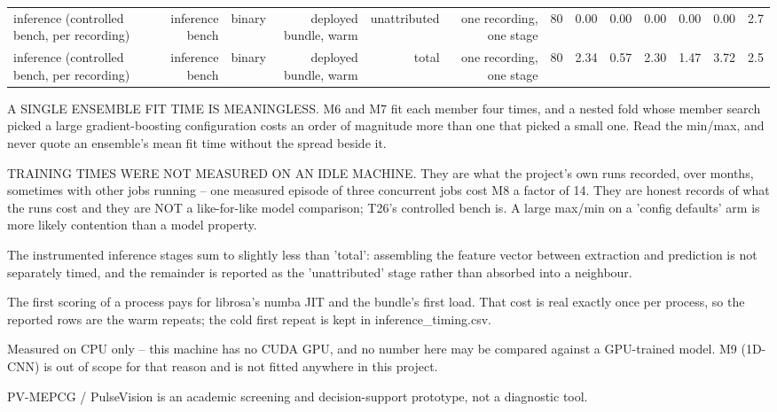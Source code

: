\begin{table}[htbp]
\begin{tabular}{lrrrrrrrrrrrr}
    inference (controlled bench, per recording) & inference bench & binary & deployed bundle, warm & unattributed & one recording, one stage & 80 & 0.00 & 0.00 & 0.00 & 0.00 & 0.00 & 2.7 \\
    inference (controlled bench, per recording) & inference bench & binary & deployed bundle, warm & total & one recording, one stage & 80 & 2.34 & 0.57 & 2.30 & 1.47 & 3.72 & 2.5 \\
    \bottomrule
  \end{tabular}
  \par\footnotesize A SINGLE ENSEMBLE FIT TIME IS MEANINGLESS. M6 and M7 fit each member four times, and a nested fold whose member search picked a large gradient-boosting configuration costs an order of magnitude more than one that picked a small one. Read the min/max, and never quote an ensemble's mean fit time without the spread beside it.
  \par\footnotesize TRAINING TIMES WERE NOT MEASURED ON AN IDLE MACHINE. They are what the project's own runs recorded, over months, sometimes with other jobs running -- one measured episode of three concurrent jobs cost M8 a factor of 14. They are honest records of what the runs cost and they are NOT a like-for-like model comparison; T26's controlled bench is. A large max/min on a 'config defaults' arm is more likely contention than a model property.
  \par\footnotesize The instrumented inference stages sum to slightly less than 'total': assembling the feature vector between extraction and prediction is not separately timed, and the remainder is reported as the 'unattributed' stage rather than absorbed into a neighbour.
  \par\footnotesize The first scoring of a process pays for librosa's numba JIT and the bundle's first load. That cost is real exactly once per process, so the reported rows are the warm repeats; the cold first repeat is kept in inference\_timing.csv.
  \par\footnotesize Measured on CPU only -- this machine has no CUDA GPU, and no number here may be compared against a GPU-trained model. M9 (1D-CNN) is out of scope for that reason and is not fitted anywhere in this project.
  \par\footnotesize PV-MEPCG / PulseVision is an academic screening and decision-support prototype, not a diagnostic tool.
\end{table}
